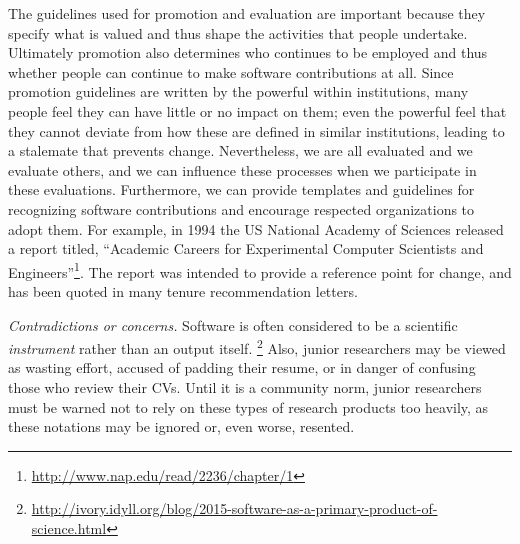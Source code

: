 \documentclass[a4paper,UKenglish]{dagman}
\begin{document}
The guidelines used for promotion and evaluation are important because they specify what is valued and thus shape the activities that people undertake. Ultimately promotion also determines who continues to be employed and thus whether people can continue to make software contributions at all. Since promotion guidelines are written by the powerful within institutions, many people feel they can have little or no impact on them; even the powerful feel that they cannot deviate from how these are defined in similar institutions, leading to a stalemate that prevents change.
Nevertheless, we are all evaluated and we evaluate others, and we can influence these processes when we participate in these evaluations.
Furthermore, we can provide templates and guidelines for recognizing software contributions and encourage respected organizations to adopt them.
For example, in 1994 the US National Academy of Sciences released a report titled, ``Academic Careers for Experimental Computer Scientists and Engineers''\footnote{\url{http://www.nap.edu/read/2236/chapter/1}}. The report was intended to provide a reference point for change, and has been quoted in many tenure recommendation letters.


\emph{Contradictions or concerns.}
Software is often considered to be a scientific \emph{instrument} rather than an output itself.%
\footnote{\url{http://ivory.idyll.org/blog/2015-software-as-a-primary-product-of-science.html}}
Also, junior researchers may be viewed as wasting effort, accused of padding their resume, or in danger of confusing those who review their CVs. Until it is a community norm, junior researchers must be warned not to rely on these types of research products too heavily, as these notations may be ignored or, even worse, resented.
\end{document}
